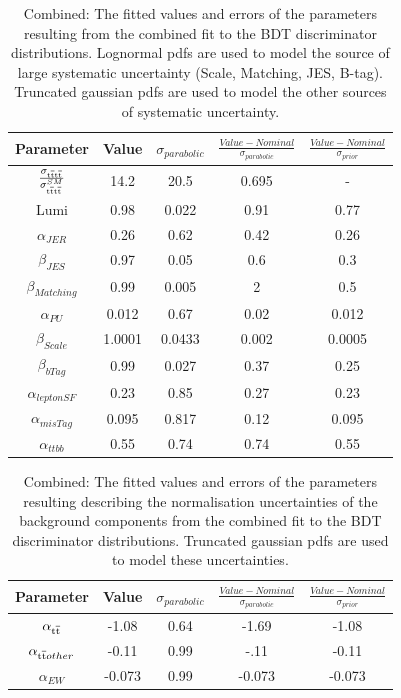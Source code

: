 \begin{table}[ht!]
\centering
\begin{tabular}{| c c cc c |}
\hline  
  Parameter &   Value & $\sigma_{parabolic}$ &    $\frac{Value-Nominal}{\sigma_{parabolic}}$ &    $\frac{Value-Nominal}{\sigma_{prior}}$ \\
\hline   
$\frac{\sigma_{\mathrm{t}\overline{\mathrm{t}}\mathrm{t}\overline{\mathrm{t}}}}{\sigma^{SM}_{\mathrm{t}\overline{\mathrm{t}}\mathrm{t}\overline{\mathrm{t}}}}$  & 14.2  & 20.5 & 0.695 & - \\
    \hline  
    Lumi  &   0.98 &  0.022  & 0.91 & 0.77 \\
    \hline  
    $\alpha_{JER}$ &   0.26 &  0.62   & 0.42 & 0.26 \\  
    \hline  
    $\beta_{JES}$  & 0.97  & 0.05   & 0.6  &  0.3  \\
    \hline   
    $\beta_{Matching}$ & 0.99 &  0.005   & 2  & 0.5 \\  
    \hline  
    $\alpha_{PU}$  & 0.012  & 0.67 &  0.02 & 0.012 \\
    \hline  
    $\beta_{Scale}$  & 1.0001  & 0.0433   & 0.002  & 0.0005 \\ 
    \hline  
    $\beta_{bTag}$ & 0.99    & 0.027   & 0.37   &  0.25 \\
    \hline  
    $\alpha_{leptonSF}$ & 0.23 & 0.85    & 0.27    &  0.23 \\   
    \hline  
    $\alpha_{misTag}$ & 0.095   & 0.817   & 0.12  & 0.095 \\
    \hline  
    $\alpha_{ttbb}$  & 0.55  & 0.74 & 0.74  & 0.55\\
    \hline
\end{tabular}
\caption{Combined: The fitted values and errors of the parameters resulting from the combined fit to the BDT discriminator distributions. Lognormal pdfs are used to model the source of large systematic uncertainty (Scale, Matching, JES, B-tag). Truncated gaussian pdfs are used to model the other sources of systematic uncertainty. }
\label{tab:fittedparams2}
\end{table}

\begin{table}[ht!]
\centering
\begin{tabular}{| c c cc c |}
 \hline  
    Parameter &   Value & $\sigma_{parabolic}$ &    $\frac{Value-Nominal}{\sigma_{parabolic}}$ &    $\frac{Value-Nominal}{\sigma_{prior}}$ \\
    \hline   
    $\alpha_{\mathrm{t}\overline{\mathrm{t}}}$ &   -1.08 &  0.64 &  -1.69 & -1.08 \\  
    \hline  
    $\alpha_{\mathrm{t}\overline{\mathrm{t}} other}$  & -0.11  & 0.99 & -.11  & -0.11  \\
    \hline   
    $\alpha_{EW}$ & -0.073 &  0.99 &  -0.073 & -0.073  \\  
    \hline  
\end{tabular}
\caption{Combined: The fitted values and errors of the parameters resulting describing the normalisation uncertainties of the background components from the combined fit to the BDT discriminator distributions. Truncated gaussian pdfs are used to model these uncertainties. }
\label{tab:fittedparams3}
\end{table}


